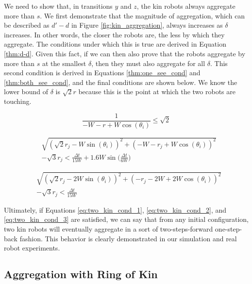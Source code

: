 \documentclass[conference]{IEEEtran}
\begin{document}
    We need to show that, in transitions $y$ and $z$, the kin robots always aggregate more than $s$. We first demonstrate that the magnitude of aggregation, which can be described as $d'-d$ in Figure \ref{fig:kin_aggregation}, always increases as $\delta$ increases. In other words, the closer the robots are, the less by which they aggregate. The conditions under which this is true are derived in Equation \ref{thm:d-d}. Given this fact, if we can then also prove that the robots aggregate by more than $s$ at the smallest $\delta$, then they must also aggregate for all $\delta$. This second condition is derived in Equations \ref{thm:one_see_cond} and \ref{thm:both_see_cond}, and the final conditions are shown below. We know the lower bound of $\delta$ is $\sqrt{2}r$ because this is the point at which the two robots are touching.

    \begin{equation} \label{eq:two_kin_cond_1}
        \frac{1}{-W-r+W\cos(\theta_i)} \leq \sqrt{2}
    \end{equation}

    \begin{equation} \label{eq:two_kin_cond_2}
      \begin{split}
        &\sqrt{(\sqrt{2}r_j - W\sin(\theta_i))^2 + (-W-r_j+W\cos(\theta_i))^2} \\
        & - \sqrt{3}r_j < \frac{\Delta t}{15W} + 1.6W\sin\bigg(\frac{\Delta t}{6W}\bigg)
      \end{split}
    \end{equation}

    \begin{equation} \label{eq:two_kin_cond_3}
      \begin{split}
        &\sqrt{(\sqrt{2}r_j - 2W\sin(\theta_i))^2 + (-r_j-2W+2W\cos(\theta_i))^2} \\
        & - \sqrt{3}r_j < \frac{\Delta t}{15W}
      \end{split}
    \end{equation}

    Ultimately, if Equations \eqref{eq:two_kin_cond_1}, \eqref{eq:two_kin_cond_2}, and \eqref{eq:two_kin_cond_3} are satisfied, we can say that from any initial configuration, two kin robots will eventually aggregate in a sort of two-steps-forward one-step-back fashion. This behavior is clearly demonstrated in our simulation and real robot experiments.

  \subsection{Aggregation with Ring of Kin}
\end{document}
